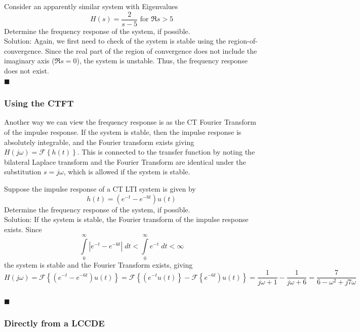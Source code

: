 \begin{example} Consider an apparently similar system with Eigenvalues
  \[
  H(s) = \frac{2}{s-5}\mbox{ for } \Re{s} > 5
  \]
  Determine the frequency response of the system, if possible.\\

  Solution: Again, we first need to check of the system is stable using the region-of-convergence. Since the real part of the region of convergence does not include the imaginary axis ($\Re s = 0$), the system is unstable. Thus, the frequency response does not exist.
  \\$\blacksquare$
\end{example}

\subsubsection*{Using the CTFT}

Another way we can view the frequency response is as the CT Fourier Transform of the impulse response. If the system is stable, then the impulse response is absolutely integrable, and the Fourier transform exists giving $H(j\omega) = \mathcal{F}\left\{h(t)\right\}$. This is connected to the transfer function by noting the bilateral Laplace transform and the Fourier Transform are identical under the substitution $s = j\omega$, which is allowed if the system is stable.

\begin{example} Suppose the impulse response of a CT LTI system is given by
  \[
  h(t) = \left(e^{-t}-e^{-6t}\right)u(t) 
  \]
  Determine the frequency response of the system, if possible.\\

  Solution: If the system is stable, the Fourier transform of the impulse response exists. Since
  \[
  \int\limits_{0}^{\infty} \left| e^{-t}-e^{-6t} \right| \; dt < \int\limits_{0}^{\infty} e^{-t} \; dt < \infty 
  \]
  the system is stable and the Fourier Transform exists, giving
  \[
H(j\omega) = \mathcal{F}\left\{ \left(e^{-t}-e^{-6t}\right)u(t) \right\} = \mathcal{F}\left\{ \left(e^{-t}u(t) \right\} - \mathcal{F}\left\{e^{-6t}\right)u(t) \right\} = \frac{1}{j\omega + 1} - \frac{1}{j\omega + 6} = \frac{7}{6-\omega^2 + j7\omega}
\]\\
$\blacksquare$
\end{example}

\subsubsection*{Directly from a LCCDE}

